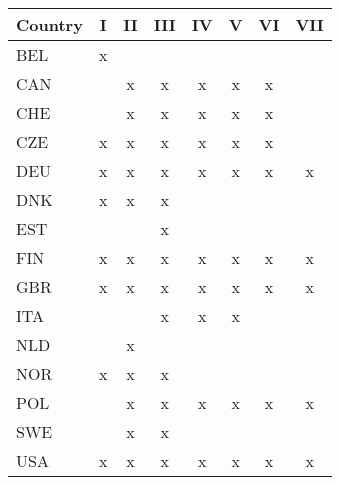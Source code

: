 \begin{tabular}{lccccccc}
Country & I & II & III & IV & V & VI & VII \\  \hline 
BEL&x&&&&&&\\
CAN&&x&x&x&x&x&\\
CHE&&x&x&x&x&x&\\
CZE&x&x&x&x&x&x&\\
DEU&x&x&x&x&x&x&x\\
DNK&x&x&x&&&&\\
EST&&&x&&&&\\
FIN&x&x&x&x&x&x&x\\
GBR&x&x&x&x&x&x&x\\
ITA&&&x&x&x&&\\
NLD&&x&&&&&\\
NOR&x&x&x&&&&\\
POL&&x&x&x&x&x&x\\
SWE&&x&x&&&&\\
USA&x&x&x&x&x&x&x\\
\hline \end{tabular}
